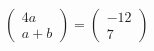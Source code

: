 \hspace*{2mm}\begin{minipage}[t]{\dimexpr\linewidth-2mm\relax}\vspace{0pt}
$\begin{pmatrix} 4a \\ a+b \end{pmatrix}=\begin{pmatrix} -12 \\ 7 \end{pmatrix}$\end{minipage}
